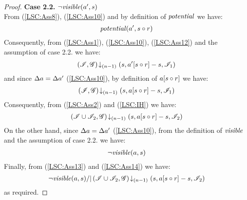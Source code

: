 \begin{lemma}
\begin{proof}
\noindent\textbf{Case 2.2.} $\neg\mathit{visible}(a', s)$ \\
From (\ref{LSC:Ass8}), (\ref{LSC:Ass10}) and by definition of $\mathit{potential}$ we have:
%
\begin{align}
	\mathit{potential}(a', s \circ r) \label{LSC:Ass12}
\end{align}
%
Consequently, from (\ref{LSC:Ass1}), (\ref{LSC:Ass10}), (\ref{LSC:Ass12}) and the assumption of case 2.2. we have:
%
\begin{align*}
	\left(\mathscr{I}, \mathscr{G}\right) \!\downarrow_{(n-1)} \left(s, a'[s \circ r] - s, \mathscr{I}_1\right)
\end{align*}
% 
and since $\Delta {a} = \Delta {a'}$ (\ref{LSC:Ass10}), by definition of $a[s \circ r]$ we have:
%
\begin{align*}
	\left(\mathscr{I}, \mathscr{G}\right) \!\downarrow_{(n-1)} \left(s, a[s \circ r] - s, \mathscr{I}_1\right) 
\end{align*}
%
Consequently, from (\ref{LSC:Ass2}) and (\ref{LSC:IH}) we have: 
%
\begin{align}
	\left(\mathscr{I} \cup \mathscr{I}_2, \mathscr{G}\right) \!\downarrow_{(n-1)} \left(s, a[s \circ r] - s, \mathscr{I}_2\right) \label{LSC:Ass13}
\end{align}
%
On the other hand, since $\Delta {a} = \Delta {a'}$ (\ref{LSC:Ass10}), from the definition of $\mathit{visible}$ and the assumption of case 2.2. we have:
%
\begin{align}
	\neg\mathit{visible}(a, s) \label{LSC:Ass14}
\end{align}
Finally, from (\ref{LSC:Ass13}) and (\ref{LSC:Ass14}) we have:
%
\begin{align*}
	\neg\mathit{visible}(a, s) /| \left(\mathscr{I} \cup \mathscr{I}_2, \mathscr{G}\right) \!\downarrow_{(n-1)} \left(s, a[s \circ r] - s, \mathscr{I}_2\right) 
\end{align*}
%
as required.

\end{proof}
\end{lemma}
%
%
%
%
%
%
